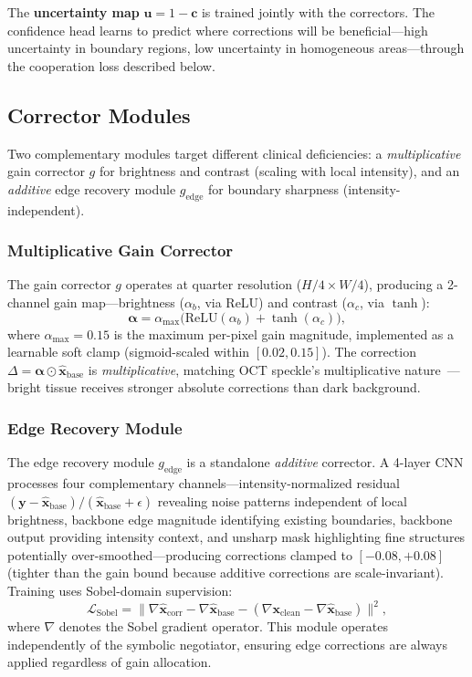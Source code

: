\documentclass[journal,twoside,web]{ieeecolor}
\begin{document}
The \textbf{uncertainty map} $\mathbf{u} = 1 - \mathbf{c}$ is trained jointly with the correctors. The confidence head learns to predict where corrections will be beneficial---high uncertainty in boundary regions, low uncertainty in homogeneous areas---through the cooperation loss described below.

\subsection{Corrector Modules}
\label{sec:corrector_modules}
Two complementary modules target different clinical deficiencies: a \emph{multiplicative} gain corrector $g$ for brightness and contrast (scaling with local intensity), and an \emph{additive} edge recovery module $g_\text{edge}$ for boundary sharpness (intensity-independent).

\subsubsection{Multiplicative Gain Corrector}
The gain corrector $g$ operates at quarter resolution ($H/4 \times W/4$), producing a 2-channel gain map---brightness ($\alpha_b$, via ReLU) and contrast ($\alpha_c$, via $\tanh$):
\begin{equation}
\boldsymbol{\alpha} = \alpha_{\max}\!\big(\text{ReLU}(\alpha_b) + \tanh(\alpha_c)\big),
\label{eq:gain_map}
\end{equation}
where $\alpha_{\max} = 0.15$ is the maximum per-pixel gain magnitude, implemented as a learnable soft clamp (sigmoid-scaled within $[0.02, 0.15]$). The correction $\Delta = \boldsymbol{\alpha} \odot \hat{\mathbf{x}}_\text{base}$ is \emph{multiplicative}, matching OCT speckle's multiplicative nature~\cite{goodman2007speckle}---bright tissue receives stronger absolute corrections than dark background.

\subsubsection{Edge Recovery Module}
The edge recovery module $g_\text{edge}$ is a standalone \emph{additive} corrector. A 4-layer CNN processes four complementary channels---intensity-normalized residual $(\mathbf{y} - \hat{\mathbf{x}}_\text{base})/(\hat{\mathbf{x}}_\text{base} + \epsilon)$ revealing noise patterns independent of local brightness, backbone edge magnitude identifying existing boundaries, backbone output providing intensity context, and unsharp mask highlighting fine structures potentially over-smoothed---producing corrections clamped to $[-0.08, +0.08]$ (tighter than the gain bound because additive corrections are scale-invariant). Training uses Sobel-domain supervision:
\begin{equation}
\mathcal{L}_\text{Sobel} = \big\|\nabla\hat{\mathbf{x}}_\text{corr} - \nabla\hat{\mathbf{x}}_\text{base} - (\nabla\mathbf{x}_\text{clean} - \nabla\hat{\mathbf{x}}_\text{base})\big\|^2,
\label{eq:sobel_loss}
\end{equation}
where $\nabla$ denotes the Sobel gradient operator. This module operates independently of the symbolic negotiator, ensuring edge corrections are always applied regardless of gain allocation.
\end{document}
